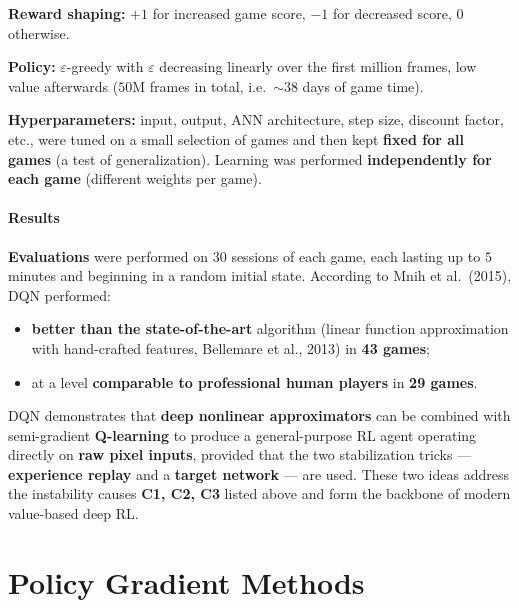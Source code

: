 \documentclass[11pt,a4paper]{article}
\theoremstyle{definition}
\theoremstyle{plain}
\theoremstyle{remark}
\begin{document}
\textbf{Reward shaping:} $+1$ for increased game score, $-1$ for decreased score, $0$ otherwise.

\textbf{Policy:} $\varepsilon$-greedy with $\varepsilon$ decreasing linearly over the first million frames, low value afterwards ($50$M frames in total, i.e.\ $\sim 38$ days of game time).

\textbf{Hyperparameters:} input, output, ANN architecture, step size, discount factor, etc., were tuned on a small selection of games and then kept \textbf{fixed for all games} (a test of generalization). Learning was performed \textbf{independently for each game} (different weights per game).

\subsection{Results}

\textbf{Evaluations} were performed on $30$ sessions of each game, each lasting up to $5$ minutes and beginning in a random initial state. According to Mnih et al.\ (2015), DQN performed:
\begin{itemize}
    \item \textbf{better than the state-of-the-art} algorithm (linear function approximation with hand-crafted features, Bellemare et al., 2013) in \textbf{43 games};
    \item at a level \textbf{comparable to professional human players} in \textbf{29 games}.
\end{itemize}

\begin{tcolorbox}[colback=yellow!10!white, colframe=orange!80!black, title={Take-Away}]
DQN demonstrates that \textbf{deep nonlinear approximators} can be combined with semi-gradient \textbf{Q-learning} to produce a general-purpose RL agent operating directly on \textbf{raw pixel inputs}, provided that the two stabilization tricks — \textbf{experience replay} and a \textbf{target network} — are used. These two ideas address the instability causes \textbf{C1, C2, C3} listed above and form the backbone of modern value-based deep RL.
\end{tcolorbox}

\part{Policy Gradient Methods}
\end{document}
